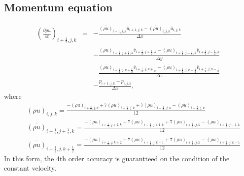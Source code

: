 \subsection{Momentum equation}
\begin{eqnarray}
\left(\frac{\partial \rho u}{\partial t}\right)_{i+\frac{1}{2},j,k}
&=& - \frac{\overline{(\rho u)}_{i+1,j,k} \overline{u}_{i+1,j,k} 
           -\overline{(\rho u)}_{i,j,k} \overline{u}_{i,j,k}}
     {\Delta x}\nonumber\\
& & - \frac{\overline{(\rho u)}_{i+\frac{1}{2},j+\frac{1}{2},k}  \overline{v}_{i+\frac{1}{2},j+\frac{1}{2},k} 
           -\overline{(\rho u)}_{i+\frac{1}{2},j-\frac{1}{2},k}  \overline{v}_{i+\frac{1}{2},j-\frac{1}{2},k}}
     {\Delta y}\nonumber\\
& & - \frac{\overline{(\rho u)}_{i+\frac{1}{2},j,k+\frac{1}{2}}  \overline{v}_{i+\frac{1}{2},j,k+\frac{1}{2}} 
           -\overline{(\rho u)}_{i+\frac{1}{2},j,k-\frac{1}{2}}  \overline{v}_{i+\frac{1}{2},j,k-\frac{1}{2}}}
     {\Delta z}\nonumber\\
& & -\frac{p_{i+1,j,k}-p_{i,j,k}}{\Delta x},
\end{eqnarray}
where 
\begin{eqnarray}
&& \overline{(\rho u)}_{i,j,k} = \frac{-(\rho u)_{i+\frac{3}{2},j,k}+7(\rho u)_{i+\frac{1}{2},j,k}+7(\rho u)_{i-\frac{1}{2},j,k}-(\rho u)_{i-\frac{3}{2},j,k}}{12}\\
&& \overline{(\rho u)}_{i+\frac{1}{2},j+\frac{1}{2},k} = \frac{-(\rho u)_{i+\frac{1}{2},j+2,k}+7(\rho u)_{i+\frac{1}{2},j+1,k}+7(\rho u)_{i+\frac{1}{2},j,k}-(\rho u)_{i+\frac{1}{2},j-1,k}}{12}\\
&& \overline{(\rho u)}_{i+\frac{1}{2},j,k+\frac{1}{2}} = \frac{-(\rho u)_{i+\frac{1}{2},j,k+2}+7(\rho u)_{i+\frac{1}{2},j,k+1}+7(\rho u)_{i+\frac{1}{2},j,k}-(\rho u)_{i+\frac{1}{2},j,k-1}}{12}
\end{eqnarray}
In this form, the 4th order accuracy is guarantteed 
on the condition of the constant velocity.

